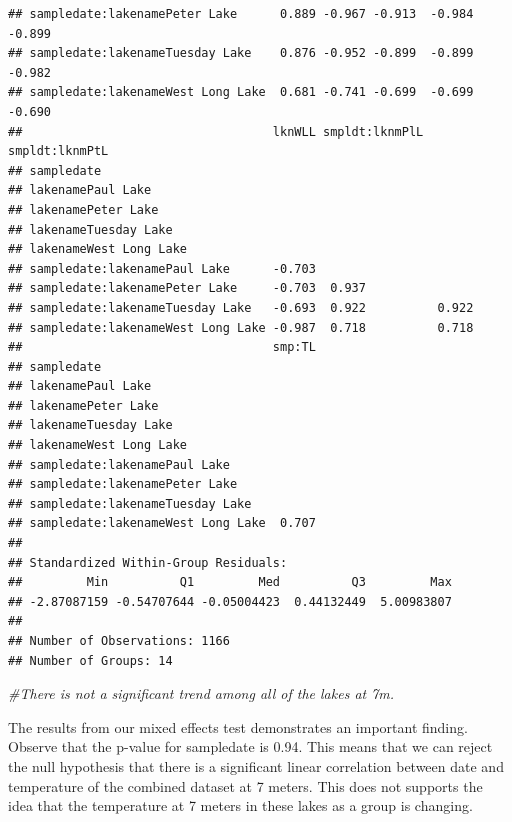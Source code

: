 \documentclass[12pt,]{article}
\newenvironment{Shaded}{\begin{snugshade}}{\end{snugshade}}
\newcommand{\CommentTok}[1]{\textcolor[rgb]{0.56,0.35,0.01}{\textit{#1}}}
\begin{document}
\begin{verbatim}
## sampledate:lakenamePeter Lake      0.889 -0.967 -0.913  -0.984  -0.899
## sampledate:lakenameTuesday Lake    0.876 -0.952 -0.899  -0.899  -0.982
## sampledate:lakenameWest Long Lake  0.681 -0.741 -0.699  -0.699  -0.690
##                                   lknWLL smpldt:lknmPlL smpldt:lknmPtL
## sampledate                                                            
## lakenamePaul Lake                                                     
## lakenamePeter Lake                                                    
## lakenameTuesday Lake                                                  
## lakenameWest Long Lake                                                
## sampledate:lakenamePaul Lake      -0.703                              
## sampledate:lakenamePeter Lake     -0.703  0.937                       
## sampledate:lakenameTuesday Lake   -0.693  0.922          0.922        
## sampledate:lakenameWest Long Lake -0.987  0.718          0.718        
##                                   smp:TL
## sampledate                              
## lakenamePaul Lake                       
## lakenamePeter Lake                      
## lakenameTuesday Lake                    
## lakenameWest Long Lake                  
## sampledate:lakenamePaul Lake            
## sampledate:lakenamePeter Lake           
## sampledate:lakenameTuesday Lake         
## sampledate:lakenameWest Long Lake  0.707
## 
## Standardized Within-Group Residuals:
##         Min          Q1         Med          Q3         Max 
## -2.87087159 -0.54707644 -0.05004423  0.44132449  5.00983807 
## 
## Number of Observations: 1166
## Number of Groups: 14
\end{verbatim}

\begin{Shaded}
\begin{Highlighting}[]
\CommentTok{#There is not a significant trend among all of the lakes at 7m.}
\end{Highlighting}
\end{Shaded}

The results from our mixed effects test demonstrates an important
finding. Observe that the p-value for sampledate is 0.94. This means
that we can reject the null hypothesis that there is a significant
linear correlation between date and temperature of the combined dataset
at 7 meters. This does not supports the idea that the temperature at 7
meters in these lakes as a group is changing.
\end{document}
